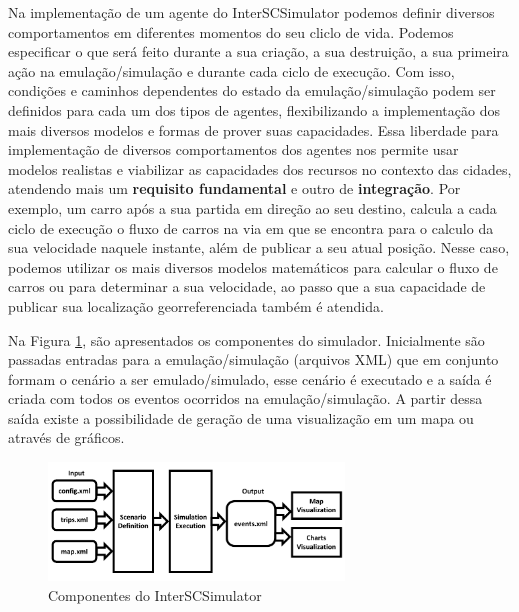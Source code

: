 Na implementação de um agente do InterSCSimulator podemos definir diversos comportamentos em diferentes momentos do seu cliclo de vida.
Podemos especificar o que será feito durante a sua criação, a sua destruição, a sua primeira ação na emulação/simulação e durante cada ciclo de execução.
Com isso, condições e caminhos dependentes do estado da emulação/simulação podem ser definidos para cada um dos tipos de agentes, flexibilizando a implementação dos
mais diversos modelos e formas de prover suas capacidades.
Essa liberdade para implementação de diversos comportamentos dos agentes nos permite usar modelos realistas e viabilizar as capacidades dos recursos no contexto das cidades,
atendendo mais um \textbf{requisito fundamental} e outro de \textbf{integração}.
Por exemplo, um carro após a sua partida em direção ao seu destino, calcula a cada ciclo de execução o fluxo de carros na via em que se encontra para o calculo da
sua velocidade naquele instante, além de publicar a seu atual posição.
Nesse caso, podemos utilizar os mais diversos modelos matemáticos para calcular o fluxo de carros ou para determinar a sua velocidade, ao passo que a sua capacidade
de publicar sua localização georreferenciada também é atendida.

Na Figura \ref{fig:simulator_components}, são apresentados os componentes do simulador.
Inicialmente são passadas entradas para a emulação/simulação (arquivos XML) que em conjunto formam o cenário a ser emulado/simulado, esse cenário é executado e a
saída é criada com todos os eventos ocorridos na emulação/simulação.
A partir dessa saída existe a possibilidade de geração de uma visualização em um mapa ou através de gráficos.

\begin{figure}[ht]
	\centering
	\includegraphics[width=0.7\textwidth]{figuras/Components.pdf}
	\caption{Componentes do InterSCSimulator}
	\label{fig:simulator_components}
\end{figure}

